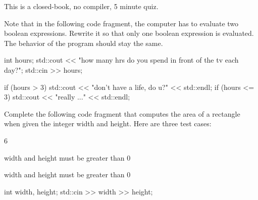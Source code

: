 

This is a closed-book, no compiler, 5 minute quiz.

\nextq
Note that in the following code fragment,
the computer has to evaluate two boolean expressions.
Rewrite it so that only one boolean expression is evaluated.
The behavior of the program should stay the same.
\\
\ANSWER
\begin{answercode}
int hours;
std::cout << "how many hrs do you spend in front of the tv each day?";
std::cin >> hours;

if (hours > 3)
{
    std::cout << "don't have a life, do u?" << std::endl;
}
if (hours <= 3)
{
    std::cout << "really ..." << std::endl;
}
\end{answercode}

\nextq
Complete the following code fragment that computes the area of a
rectangle when given the integer width and height.
Here are three test cases:
\begin{console}[fontsize=\footnotesize,commandchars=\\\{\}]
6
\end{console}
\begin{console}[fontsize=\footnotesize,commandchars=\\\{\}]
width and height must be greater than 0
\end{console}
\begin{console}[fontsize=\footnotesize,commandchars=\\\{\}]
width and height must be greater than 0
\end{console}
\ANSWER
\begin{answercode}
int width, height;
std::cin >> width >> height;

\end{answercode}


